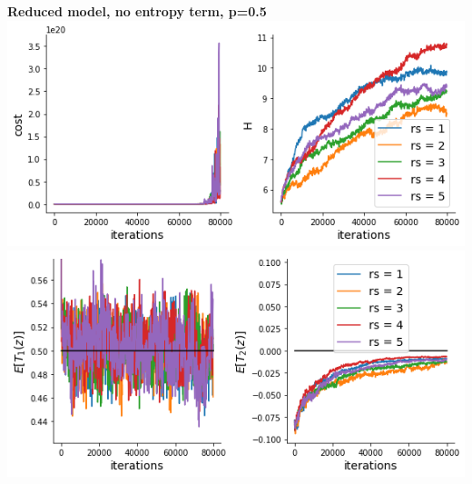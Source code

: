 \documentclass[11pt]{article}
\begin{document}
\begin{center}
\textbf{Reduced model, no entropy term, p=0.5} \\
\includegraphics[scale=0.6]{figs/cost_H_SC_reduced_c=0_p=50.png} \\
\includegraphics[scale=0.6]{figs/constraints_SC_reduced_c=0_p=50.png}
\end{center}
\end{document}
